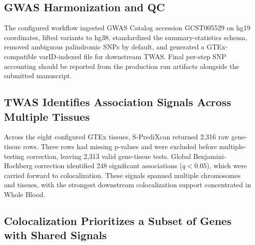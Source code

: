 \documentclass[12pt,a4paper]{article}
\begin{document}

\subsection{GWAS Harmonization and QC}

The configured workflow ingested GWAS Catalog accession GCST005529 on hg19
coordinates, lifted variants to hg38, standardized the summary-statistics
schema, removed ambiguous palindromic SNPs by default, and generated a
GTEx-compatible varID-indexed file for downstream TWAS. Final per-step SNP
accounting should be reported from the production run artifacts alongside the
submitted manuscript.

\subsection{TWAS Identifies Association Signals Across Multiple Tissues}

Across the eight configured GTEx tissues, S-PrediXcan returned 2,316 raw
gene-tissue rows. Three rows had missing p-values and were excluded before
multiple-testing correction, leaving 2,313 valid gene-tissue tests. Global
Benjamini-Hochberg correction identified 248 significant associations
($q < 0.05$), which were carried forward to colocalization. These signals
spanned multiple chromosomes and tissues, with the strongest downstream
colocalization support concentrated in Whole Blood.



\subsection{Colocalization Prioritizes a Subset of Genes with Shared Signals}
\end{document}
